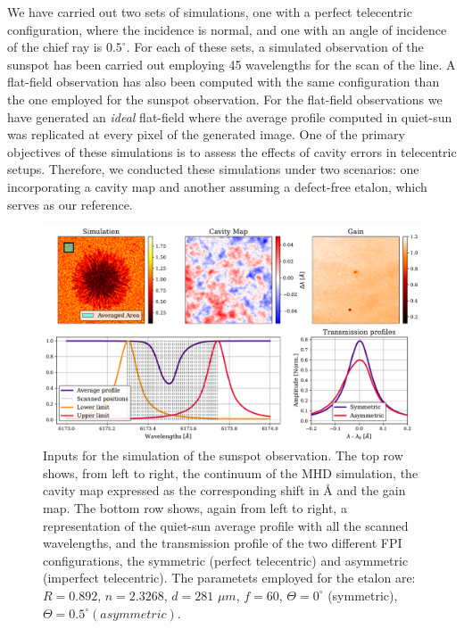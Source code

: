 We have carried out two sets of simulations, one with a perfect telecentric configuration, where the incidence is normal, and one with an angle of incidence of the chief ray is $0.5^\circ$. For each of these sets, a simulated observation of the sunspot has been carried out employing 45 wavelengths for the scan of the line. A flat-field observation has also been computed with the same configuration than the one employed for the sunspot observation. For the flat-field observations we have generated an \textit{ideal} flat-field where the average profile computed in quiet-sun was replicated at every pixel of the generated image. One of the primary objectives of these simulations is to assess the effects of cavity errors in telecentric setups. Therefore, we conducted these simulations under two scenarios: one incorporating a cavity map and another assuming a defect-free etalon, which serves as our reference.  

\begin{figure}
    \includegraphics[width=\textwidth]{figures/Mancha/Inputs_mancha.pdf}
    \caption{
      Inputs for the simulation of the sunspot observation. The top row shows, from left to right, the continuum of the MHD simulation, the cavity map expressed as the corresponding shift in \r{A} and the gain map. The bottom row shows, again from left to right, a representation of the quiet-sun average profile with all the scanned wavelengths, and the transmission profile of the two different FPI configurations, the symmetric (perfect telecentric) and asymmetric (imperfect telecentric). The parametets employed for the etalon are: $R=0.892$, $n = 2.3268$, $d = 281$ $\mu m$, $f = 60$, $\Theta = 0^{\circ}$ (symmetric), $\Theta = 0.5^{\circ} (asymmetric)$.
      \label{fig_mancha: Inputs}}
\end{figure}

